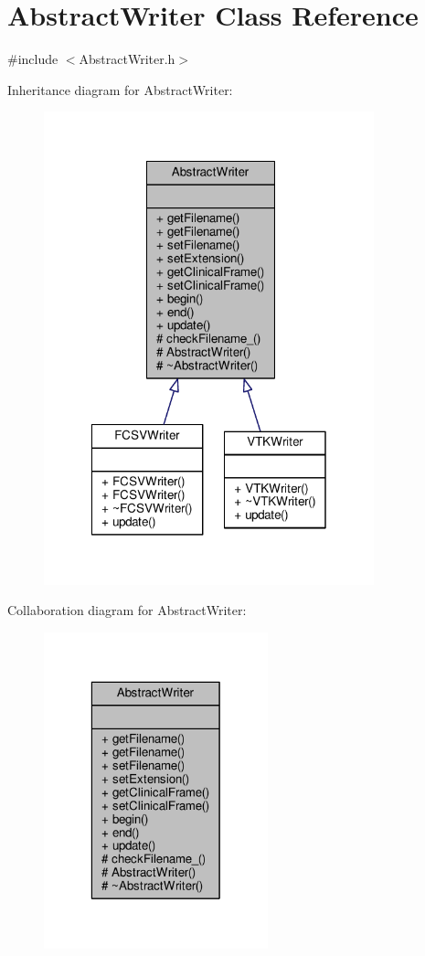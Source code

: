 \hypertarget{classAbstractWriter}{\section{Abstract\-Writer Class Reference}
\label{classAbstractWriter}
}


{\ttfamily \#include $<$Abstract\-Writer.\-h$>$}



Inheritance diagram for Abstract\-Writer\-:
\nopagebreak
\begin{figure}[H]
\begin{center}
\leavevmode
\includegraphics[width=271pt]{classAbstractWriter__inherit__graph}
\end{center}
\end{figure}


Collaboration diagram for Abstract\-Writer\-:
\nopagebreak
\begin{figure}[H]
\begin{center}
\leavevmode
\includegraphics[width=184pt]{classAbstractWriter__coll__graph}
\end{center}
\end{figure}
